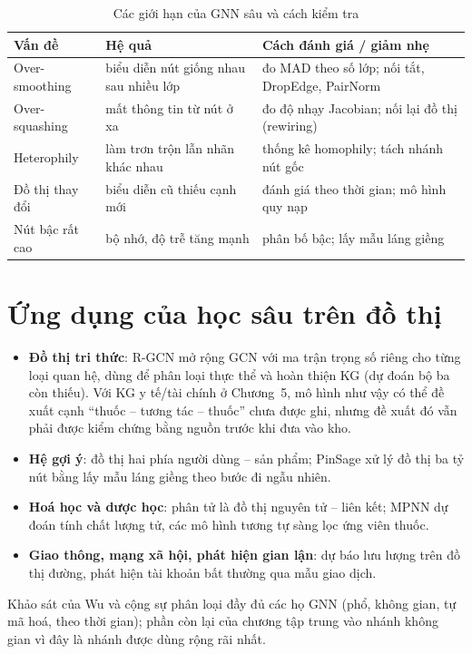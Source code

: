 \begin{table}[H]\centering\caption{Các giới hạn của GNN sâu và cách kiểm tra}\label{tab:ch6-limits}
{\small\begin{tabular}{L{3.2cm}L{4.8cm}L{6.4cm}}
\toprule
Vấn đề & Hệ quả & Cách đánh giá / giảm nhẹ \\
\midrule
Over-smoothing & biểu diễn nút giống nhau sau nhiều lớp & đo MAD theo số lớp; nối tắt, DropEdge, PairNorm \\
Over-squashing & mất thông tin từ nút ở xa & đo độ nhạy Jacobian; nối lại đồ thị (rewiring) \\
Heterophily & làm trơn trộn lẫn nhãn khác nhau & thống kê homophily; tách nhánh nút gốc \\
Đồ thị thay đổi & biểu diễn cũ thiếu cạnh mới & đánh giá theo thời gian; mô hình quy nạp \\
Nút bậc rất cao & bộ nhớ, độ trễ tăng mạnh & phân bố bậc; lấy mẫu láng giềng \\
\bottomrule
\end{tabular}}
\end{table}

\section{Ứng dụng của học sâu trên đồ thị}
\label{sec:gnn-apps}

\begin{itemize}
  \item \textbf{Đồ thị tri thức}: R-GCN \cite{ch6:schlichtkrull2018} mở rộng GCN với ma trận trọng số riêng cho từng
        loại quan hệ, dùng để phân loại thực thể và hoàn thiện KG (dự đoán bộ ba còn thiếu). Với KG y tế/tài chính ở
        Chương~5, mô hình như vậy có thể đề xuất cạnh ``thuốc -- tương tác -- thuốc'' chưa được ghi,
        nhưng đề xuất đó vẫn phải được kiểm chứng bằng nguồn trước khi đưa vào kho.
  \item \textbf{Hệ gợi ý}: đồ thị hai phía người dùng -- sản phẩm; PinSage \cite{ch6:ying2018pinsage} xử lý đồ thị ba tỷ
        nút bằng lấy mẫu láng giềng theo bước đi ngẫu nhiên.
  \item \textbf{Hoá học và dược học}: phân tử là đồ thị nguyên tử -- liên kết; MPNN \cite{ch6:gilmer2017} dự đoán tính
        chất lượng tử, các mô hình tương tự sàng lọc ứng viên thuốc.
  \item \textbf{Giao thông, mạng xã hội, phát hiện gian lận}: dự báo lưu lượng trên đồ thị đường, phát hiện tài khoản
        bất thường qua mẫu giao dịch.
\end{itemize}
Khảo sát của Wu và cộng sự \cite{ch6:wu2021survey} phân loại đầy đủ các họ GNN (phổ, không gian, tự mã hoá, theo thời
gian); phần còn lại của chương tập trung vào nhánh không gian vì đây là nhánh được dùng rộng rãi nhất.

